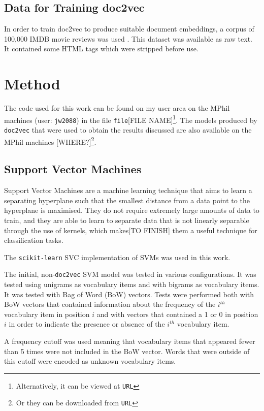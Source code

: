 \documentclass[twocolumn]{article}
\begin{document}
\subsection{Data for Training doc2vec}

In order to train doc2vec to produce suitable document embeddings, a corpus of 100,000 IMDB movie reviews was used \cite{bigimdb}. This dataset was available as raw text. It contained some HTML tags which were stripped before use.

\section{Method}

The code used for this work can be found on my user area on the MPhil machines (user: \texttt{jw2088}) in the file \texttt{file}[FILE NAME]\footnote{Alternatively, it can be viewed at \texttt{{URL}}}. The models produced by \texttt{doc2vec} that were used to obtain the results discussed are also available on the MPhil machines [WHERE?]\footnote{Or they can be downloaded from \texttt{{URL}}}. 

\subsection{Support Vector Machines}

Support Vector Machines are a machine learning technique that aims to learn a separating hyperplane such that the smallest distance from a data point to the hyperplane is maximised. They do not require extremely large amounts of data to train, and they are able to learn to separate data that is not linearly separable through the use of kernels, which makes[TO FINISH]
 them a useful technique for classification tasks.

The \texttt{scikit-learn}\cite{scikit-learn} SVC implementation of SVMs was used in this work.

The initial, non-\texttt{doc2vec} SVM model was tested in various configurations. It was tested using unigrams as vocabulary items and with bigrams as vocabulary items. It was tested with Bag of Word (BoW) vectors. Tests were performed both with BoW vectors that contained information about the frequency of the $i^{th}$ vocabulary item in position $i$ and with vectors that contained a 1 or 0 in position $i$ in order to indicate the presence or absence of the $i^{th}$ vocabulary item. 

A frequency cutoff was used meaning that vocabulary items that appeared fewer than 5 times were not included in the BoW vector. Words that were outside of this cutoff were encoded as unknown vocabulary items.
\end{document}
